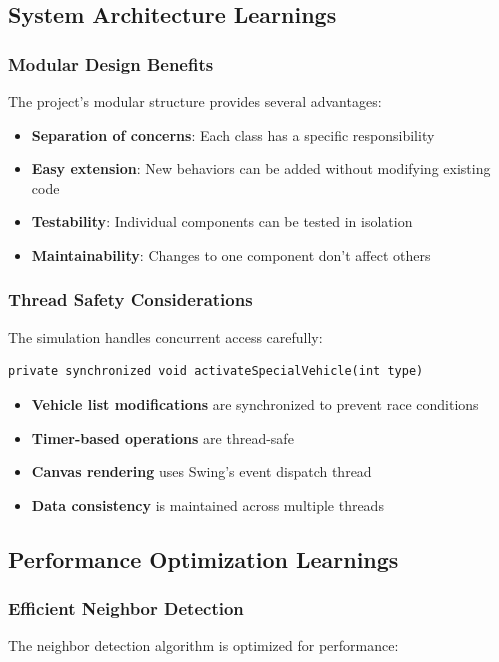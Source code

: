 \documentclass[12pt,a4paper]{article}
\begin{document}
\subsection{System Architecture Learnings}

\subsubsection{Modular Design Benefits}
The project's modular structure provides several advantages:

\begin{itemize}
    \item \textbf{Separation of concerns}: Each class has a specific responsibility
    \item \textbf{Easy extension}: New behaviors can be added without modifying existing code
    \item \textbf{Testability}: Individual components can be tested in isolation
    \item \textbf{Maintainability}: Changes to one component don't affect others
\end{itemize}

\subsubsection{Thread Safety Considerations}
The simulation handles concurrent access carefully:

\begin{lstlisting}
private synchronized void activateSpecialVehicle(int type)
\end{lstlisting}

\begin{itemize}
    \item \textbf{Vehicle list modifications} are synchronized to prevent race conditions
    \item \textbf{Timer-based operations} are thread-safe
    \item \textbf{Canvas rendering} uses Swing's event dispatch thread
    \item \textbf{Data consistency} is maintained across multiple threads
\end{itemize}

\subsection{Performance Optimization Learnings}

\subsubsection{Efficient Neighbor Detection}
The neighbor detection algorithm is optimized for performance:
\end{document}
